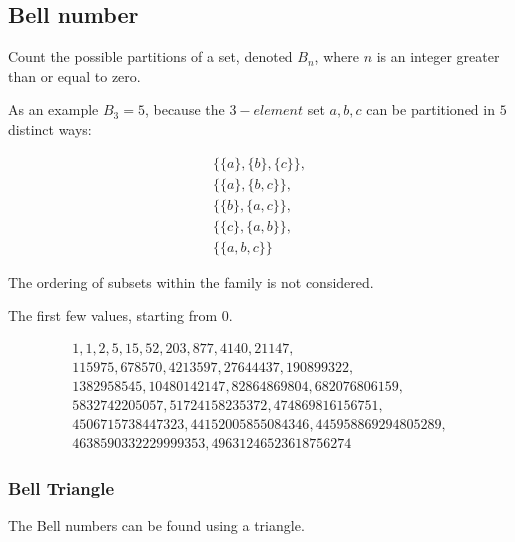 \subsection{Bell number}

Count the possible partitions of a set, denoted $B_n$, where $n$ is an integer greater than or equal to zero.

As an example $B_3 = 5$, because the $3-element$ set $a, b, c$ can be partitioned in $5$ distinct ways:

\begin{equation}
\begin{array}{c}
        \{\{a\}, \{b\}, \{c\}\}, \\
        \{\{a\}, \{b, c\}\}, \\
        \{\{b\}, \{a, c\}\}, \\
        \{\{c\}, \{a, b\}\}, \\
        \{\{a, b, c\}\} 
\end{array}
\end{equation}

The ordering of subsets within the family is not considered.

The first few values, starting from 0.

\begin{equation}
        \begin{array}{l}
        1, 1, 2, 5, 15, 52, 203, 877, 4140, 21147, \\
        115975, 678570, 4213597, 27644437, 190899322, \\
        1382958545, 10480142147, 82864869804, 682076806159, \\
        5832742205057, 51724158235372, 474869816156751, \\ 
        4506715738447323, 44152005855084346, 445958869294805289, \\
        4638590332229999353, 49631246523618756274
        \end{array}
\end{equation}

\subsubsection{Bell Triangle}

The Bell numbers can be found using a triangle.

